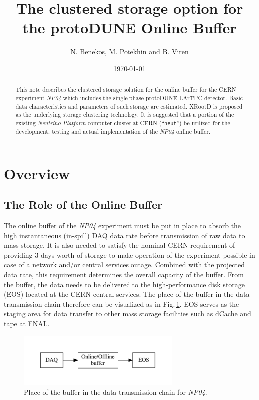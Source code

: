 \documentclass[pdftex,12pt,letter]{article}
\title{The clustered storage option for the protoDUNE \expname Online Buffer}
\date{\today}
\author{N. Benekos, M. Potekhin and B. Viren}
\newcommand{\xrd}{XRootD\xspace}
\newcommand{\expname}{\textit{NP04}\xspace}
\begin{document}
\maketitle

\begin{abstract}
\noindent  This note describes the clustered storage
solution for the online buffer for the CERN experiment \expname which includes the single-phase protoDUNE LArTPC detector.
Basic data characteristics and  parameters of such storage are estimated. \xrd is proposed as the underlying
storage clustering technology. It is suggested that a portion of the existing   \textit{Neutrino Platform}
computer cluster at CERN (``\texttt{neut}'') be utilized for the development, testing and actual implementation of the \expname online buffer. 
\end{abstract}

\section{Overview}
\subsection{The Role of the Online Buffer}
\label{sec:the_role}
The online buffer of the \expname experiment must be put in place to absorb the high instantaneous (in-spill) DAQ
data rate before transmission of raw data to mass storage. It is also needed to satisfy the nominal CERN requirement of
providing 3 days worth of storage to make operation of the experiment possible in case of a network and/or central services
outage. Combined with the projected data rate, this requirement determines the overall capacity of the buffer. From the buffer,
the data needs to be delivered to the high-performance  disk storage (EOS) located at the CERN central services.
The place of the buffer in the data transmission chain therefore can be visualized as in Fig.\,\ref{fig:big-picture}.
EOS serves as the staging area for data transfer to other mass storage facilities such as dCache and tape at FNAL.
\begin{figure}[tbh]
  \centering
  \includegraphics[width=0.7\textwidth]{../figures/big-picture.pdf}
  \caption{Place of the buffer in the data transmission chain for \expname.}
  \label{fig:big-picture}
\end{figure}
\end{document}
